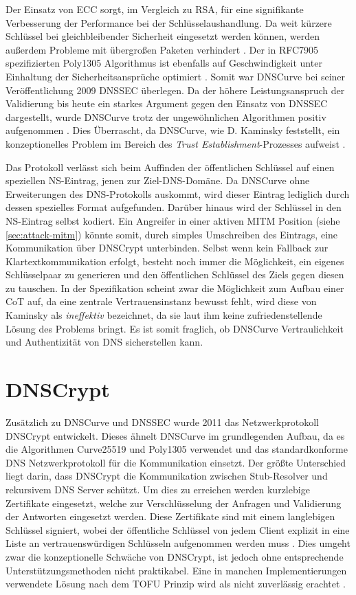 Der Einsatz von \ac{ECC} sorgt, im Vergleich zu RSA, für eine signifikante Verbesserung der Performance bei der Schlüsselaushandlung. Da weit kürzere Schlüssel bei gleichbleibender Sicherheit eingesetzt werden können, werden außerdem Probleme mit übergroßen Paketen verhindert \cite{Gupta2002}. Der in RFC7905 \cite{rfc7905} spezifizierten Poly1305 Algorithmus ist ebenfalls auf Geschwindigkeit unter Einhaltung der Sicherheitsansprüche optimiert \cite{Bernstein2005}. Somit war DNSCurve bei seiner Veröffentlichung 2009 \ac{DNSSEC} überlegen. Da der höhere Leistungsanspruch der Validierung bis heute ein starkes Argument gegen den Einsatz von \ac{DNSSEC} dargestellt, wurde DNSCurve trotz der ungewöhnlichen Algorithmen positiv aufgenommen \cite{Henry2013}. Dies Überrascht, da DNSCurve, wie D. Kaminsky feststellt, ein konzeptionelles Problem im Bereich des \textit{Trust Establishment}-Prozesses aufweist \cite{Kaminsky2011}. 

Das Protokoll verlässt sich beim Auffinden der öffentlichen Schlüssel auf einen speziellen NS-Eintrag, jenen zur Ziel-DNS-Domäne. Da DNSCurve ohne Erweiterungen des DNS-Protokolls auskommt, wird dieser Eintrag lediglich durch dessen spezielles Format aufgefunden. Darüber hinaus wird der Schlüssel in den NS-Eintrag selbst kodiert. Ein Angreifer in einer aktiven MITM Position (siehe \ref{sec:attack-mitm}) könnte somit, durch simples Umschreiben des Eintrags, eine Kommunikation über DNSCrypt unterbinden. Selbst wenn kein Fallback zur Klartextkommunikation erfolgt, besteht noch immer die Möglichkeit, ein eigenes Schlüsselpaar zu generieren und den öffentlichen Schlüssel des Ziels gegen diesen zu tauschen. In der Spezifikation scheint zwar die Möglichkeit zum Aufbau einer CoT auf, da eine zentrale Vertrauensinstanz bewusst fehlt, wird diese von Kaminsky als \textit{ineffektiv} bezeichnet, da sie laut ihm keine zufriedenstellende Lösung des Problems bringt. Es ist somit fraglich, ob DNSCurve  Vertraulichkeit und Authentizität von DNS sicherstellen kann.  

\section{DNSCrypt}
Zusätzlich zu DNSCurve und \ac{DNSSEC} wurde 2011 das Netzwerkprotokoll DNSCrypt entwickelt. Dieses ähnelt DNSCurve im grundlegenden Aufbau, da es die Algorithmen Curve25519 und Poly1305 verwendet und das standardkonforme DNS Netzwerkprotokoll für die Kommunikation einsetzt. Der größte Unterschied liegt darin, dass DNSCrypt die Kommunikation zwischen Stub-Resolver und rekursivem DNS Server schützt. Um dies zu erreichen werden kurzlebige Zertifikate eingesetzt, welche zur Verschlüsselung der Anfragen und Validierung der Antworten eingesetzt werden. Diese Zertifikate sind mit einem langlebigen Schlüssel signiert, wobei der öffentliche Schlüssel von jedem Client explizit in eine Liste an vertrauenswürdigen Schlüsseln aufgenommen werden muss \cite{Denis2016}. Dies umgeht zwar die konzeptionelle Schwäche von DNSCrypt, ist jedoch ohne entsprechende Unterstützungsmethoden nicht praktikabel. Eine in manchen Implementierungen verwendete Lösung nach dem \ac{TOFU} Prinzip wird als nicht zuverlässig erachtet \cite{Wendlandt2008}. 

